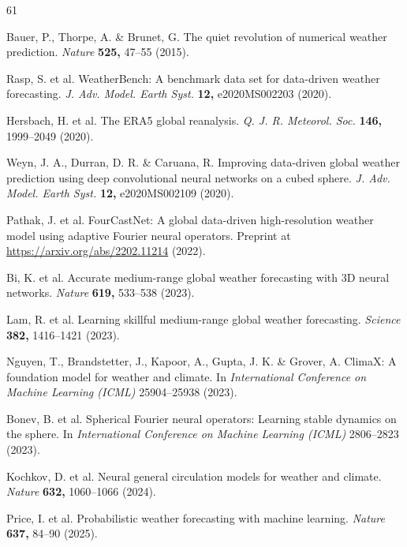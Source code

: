 \documentclass[fleqn,10pt]{wlscirep}
\begin{document}
\begin{thebibliography}{61}

Bauer, P., Thorpe, A. \& Brunet, G. The quiet revolution of numerical
  weather prediction. \textit{Nature} \textbf{525,} 47--55 (2015).

Rasp, S. et al. WeatherBench: A benchmark data set for data-driven weather
  forecasting. \textit{J. Adv. Model. Earth Syst.} \textbf{12,}
  e2020MS002203 (2020).

Hersbach, H. et al. The ERA5 global reanalysis. \textit{Q. J. R. Meteorol.
  Soc.} \textbf{146,} 1999--2049 (2020).

Weyn, J. A., Durran, D. R. \& Caruana, R. Improving data-driven global
  weather prediction using deep convolutional neural networks on a cubed
  sphere. \textit{J. Adv. Model. Earth Syst.} \textbf{12,} e2020MS002109
  (2020).

Pathak, J. et al. FourCastNet: A global data-driven high-resolution weather
  model using adaptive Fourier neural operators. Preprint at
  \url{https://arxiv.org/abs/2202.11214} (2022).

Bi, K. et al. Accurate medium-range global weather forecasting with 3D
  neural networks. \textit{Nature} \textbf{619,} 533--538 (2023).

Lam, R. et al. Learning skillful medium-range global weather forecasting.
  \textit{Science} \textbf{382,} 1416--1421 (2023).

Nguyen, T., Brandstetter, J., Kapoor, A., Gupta, J. K. \& Grover, A.
  ClimaX: A foundation model for weather and climate. In
  \textit{International Conference on Machine Learning (ICML)} 25904--25938
  (2023).

Bonev, B. et al. Spherical Fourier neural operators: Learning stable
  dynamics on the sphere. In \textit{International Conference on Machine
  Learning (ICML)} 2806--2823 (2023).

Kochkov, D. et al. Neural general circulation models for weather and
  climate. \textit{Nature} \textbf{632,} 1060--1066 (2024).

Price, I. et al. Probabilistic weather forecasting with machine learning.
  \textit{Nature} \textbf{637,} 84--90 (2025).


\end{thebibliography}
\end{document}
